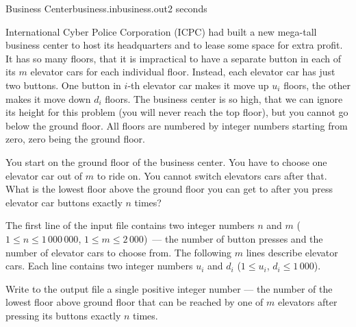 \begin{problem}{Business Center}{business.in}{business.out}{2 seconds}


International Cyber Police Corporation (ICPC) had built a new mega-tall business center
to host its headquarters and to lease some space for extra profit. 
It has so many floors, that it is impractical to have a separate button
in each of its $m$ elevator cars for each individual floor. Instead, each elevator car has just
two buttons. One button in $i$-th elevator car makes it move up $u_i$ floors, 
the other makes it move down $d_i$ floors. The business center is so high, that 
we can ignore its height for this problem (you will never reach the top floor), 
but you cannot go below the ground floor. All floors are numbered by integer 
numbers starting from zero, zero being the ground floor.

You start on the ground floor of the business center. You have to choose one
elevator car out of $m$ to ride on. You cannot switch elevators cars after that.
What is the lowest floor above the ground floor you can get to after you press 
elevator car buttons exactly $n$ times? 

\InputFile

The first line of the input file contains two integer numbers $n$ and $m$
($1 \le n \le 1\,000\,000$, $1 \le m \le 2\,000$)~--- the number of button presses
and the number of elevator cars to choose from. The following $m$ lines
describe elevator cars. Each line contains two integer numbers $u_i$ and
$d_i$ ($1 \le u_i$, $d_i \le 1\,000$).

\OutputFile

Write to the output file a single positive integer number --- the number of the lowest
floor above ground floor that can be reached by one of $m$ elevators after pressing
its buttons exactly $n$ times.

\Example

\begin{example}
%
\end{example}

\end{problem}

